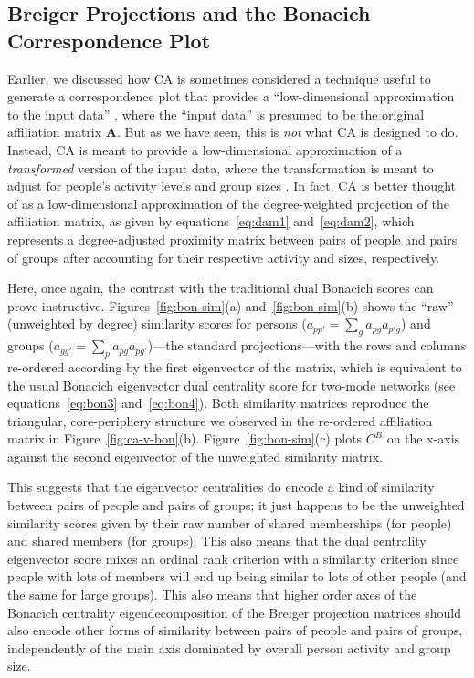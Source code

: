 \documentclass[a4paper,fleqn]{cas-sc}
\begin{document}
\subsection{Breiger Projections and the Bonacich Correspondence Plot} \label{sec:eigplot}
Earlier, we discussed how CA is sometimes considered a technique useful to generate a correspondence plot that provides a ``low-dimensional approximation to the input data'' \citep[125]{faust2005using}, where the ``input data'' is presumed to be the original affiliation matrix $\mathbf{A}$. But as we have seen, this is \textit{not} what CA is designed to do. Instead, CA is meant to provide a low-dimensional approximation of a \textit{transformed} version of the input data, where the transformation is meant to adjust for people's activity levels and group sizes \citep{desposito2014comparison}. In fact, CA is better thought of as a low-dimensional approximation of the degree-weighted projection of the affiliation matrix, as given by equations~\ref{eq:dam1} and~\ref{eq:dam2}, which represents a degree-adjusted proximity matrix between pairs of people and pairs of groups after accounting for their respective activity and sizes, respectively.

Here, once again, the contrast with the traditional dual Bonacich scores can prove instructive. Figures~\ref{fig:bon-sim}(a) and~\ref{fig:bon-sim}(b) shows the ``raw'' (unweighted by degree) similarity scores for persons ($a_{pp'} = \sum_g a_{pg}a_{p'g}$) and groups ($a_{gg'} = \sum_p a_{pg}a_{pg'}$)---the standard \citet{breiger1974duality} projections---with the rows and columns re-ordered according by the first eigenvector of the matrix, which is equivalent to the usual Bonacich eigenvector dual centrality score for two-mode networks (see equations~\ref{eq:bon3} and~\ref{eq:bon4}). Both similarity matrices reproduce the triangular, core-periphery structure we observed in the re-ordered affiliation matrix in Figure~\ref{fig:ca-v-bon}(b). Figure~\ref{fig:bon-sim}(c) plots $C^B$ on the x-axis against the second eigenvector of the unweighted similarity matrix. 

This suggests that the eigenvector centralities do encode a kind of similarity between pairs of people and pairs of groups; it just happens to be the unweighted similarity scores given by their raw number of shared memberships (for people) and shared members (for groups). This also means that the dual centrality eigenvector score mixes an ordinal rank criterion with a similarity criterion since people with lots of members will end up being similar to lots of other people (and the same for large groups). This also means that higher order axes of the Bonacich centrality eigendecomposition of the Breiger projection matrices should also encode other forms of similarity between pairs of people and pairs of groups, independently of the main axis dominated by overall person activity and group size.  
\end{document}

